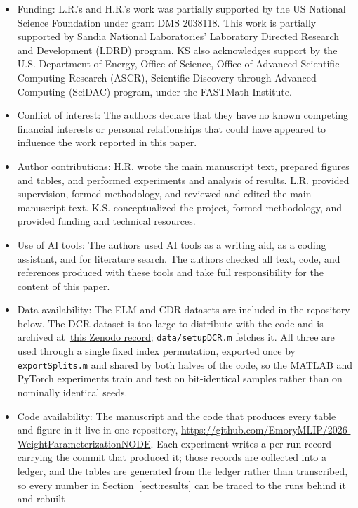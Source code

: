 \documentclass[pdflatex,sn-mathphys-num]{sn-jnl}%
\theoremstyle{thmstyleone}%
\theoremstyle{thmstyletwo}%
\theoremstyle{thmstylethree}%
\begin{document}
\begin{itemize}
    \item Funding: L.R.'s and H.R.'s work was partially supported by the US National Science Foundation under grant DMS 2038118. 
    This work is partially supported by Sandia National Laboratories' Laboratory Directed Research and Development (LDRD) program. 
KS also acknowledges support by the U.S. Department of Energy, Office of Science, Office of Advanced Scientific Computing Research (ASCR), 
Scientific Discovery through Advanced Computing (SciDAC) program, under the FASTMath Institute. 
    \item Conflict of interest: The authors declare that they have no known competing financial interests or personal relationships that could have appeared to influence the work reported in this paper.
    \item Author contributions: H.R. wrote the main manuscript text, prepared figures and tables, and performed experiments and analysis of results. L.R. provided supervision, formed methodology,  and reviewed and edited the main manuscript text. K.S. conceptualized the project, formed methodology, and provided funding and technical resources.
    \item Use of AI tools: The authors used AI tools as a writing aid, as a coding assistant, and for literature search. The authors checked all text, code, and references produced with these tools and take full responsibility for the content of this paper.
    \item Data availability: The ELM and CDR datasets are included in the repository below.
    The DCR dataset is too large to distribute with the code and is archived
    at~\href{https://doi.org/10.5281/zenodo.21537966}{this Zenodo record}; \texttt{data/setupDCR.m}
    fetches it.
    All three are used through a single fixed index permutation, exported once by
    \texttt{exportSplits.m} and shared by both halves of the code, so the MATLAB and PyTorch
    experiments train and test on bit-identical samples rather than on nominally identical seeds.
    \item Code availability: The manuscript and the code that produces every table and figure in it
    live in one repository, \url{https://github.com/EmoryMLIP/2026-WeightParameterizationNODE}.
    Each experiment writes a per-run record carrying the commit that produced it; those records are
    collected into a ledger, and the tables are generated from the ledger rather than transcribed,
    so every number in Section~\ref{sect:results} can be traced to the runs behind it and rebuilt

\end{itemize}
\end{document}

